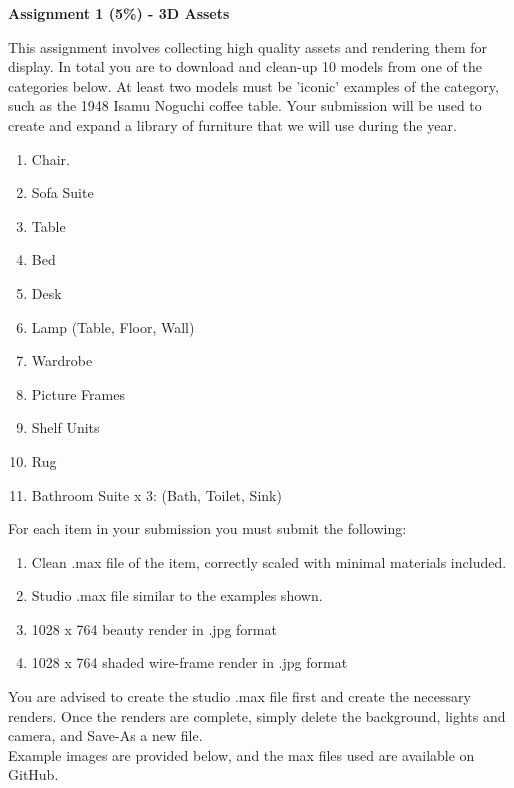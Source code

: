 
	
\begin{flushleft}
\Large\textbf{Assignment 1 (5\%) - 3D Assets }\\
\end{flushleft}

This assignment involves collecting high quality assets and rendering them for display.  In total you are to download and clean-up 10 models from one of the categories below.  At least two models must be 'iconic' examples of the category, such as the 1948 Isamu Noguchi coffee table.  Your submission will be used to create and expand a library of furniture that we will use during the year.

\begin{enumerate}
	\item Chair.
	\item Sofa Suite
	\item Table
	\item Bed
	\item Desk
	\item Lamp (Table, Floor, Wall)
	\item Wardrobe
	\item Picture Frames
	\item Shelf Units
	\item Rug
	\item Bathroom Suite x 3: (Bath, Toilet, Sink)
\end{enumerate}

For each item in your submission you must submit the following:

\begin{enumerate}
	\item Clean .max file of the item, correctly scaled with minimal materials included.
	\item Studio .max file similar to the examples shown.
	\item 1028 x 764 beauty render in .jpg format
	\item 1028 x 764 shaded wire-frame render in .jpg format
\end{enumerate}

You are advised to create the studio .max file first and create the necessary renders.  Once the renders are complete, simply delete the background, lights and camera, and Save-As a new file. \\

Example images are provided below, and the max files used are available on GitHub.\\

